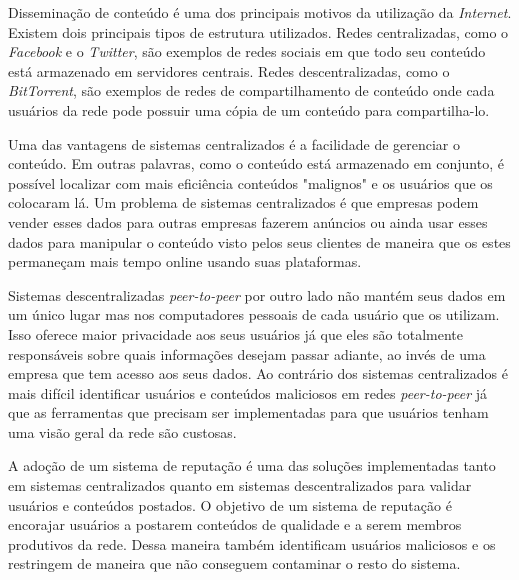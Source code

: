\documentclass[12pt]{article}
\newcommand{\PtoP} {\emph{peer-to-peer}\xspace}
\begin{document}
Disseminação de conteúdo é uma dos principais motivos da utilização da \emph{Internet}. Existem dois principais tipos de estrutura utilizados.
Redes centralizadas, como o \emph{Facebook} e o \emph{Twitter}, são exemplos de redes sociais em que todo seu conteúdo está armazenado em servidores centrais.
Redes descentralizadas, como o \emph{BitTorrent}, são exemplos de redes de compartilhamento de conteúdo onde cada usuários da rede pode possuir uma cópia de um conteúdo para compartilha-lo. 

Uma das vantagens de sistemas centralizados é a facilidade de gerenciar o conteúdo.
Em outras palavras, como o conteúdo está armazenado em conjunto, é possível localizar com mais eficiência conteúdos "malignos" e os usuários que os colocaram lá. %
Um problema de sistemas centralizados é que empresas podem vender esses dados para outras empresas fazerem anúncios ou ainda usar esses dados para manipular o conteúdo visto pelos seus clientes de maneira que os estes permaneçam mais tempo online usando suas plataformas. %

Sistemas descentralizadas \PtoP por outro lado não mantém seus dados em um único lugar mas nos computadores pessoais de cada usuário que os utilizam.
Isso oferece maior privacidade aos seus usuários já que eles são totalmente responsáveis sobre quais informações desejam passar adiante, ao invés de uma empresa que tem acesso aos seus dados. %
Ao contrário dos sistemas centralizados é mais difícil identificar usuários e conteúdos maliciosos em redes \PtoP já que as ferramentas que precisam ser implementadas para que usuários tenham uma visão geral da rede são custosas. 

A adoção de um sistema de reputação é uma das soluções implementadas tanto em sistemas centralizados quanto em sistemas descentralizados para validar usuários e conteúdos postados.
O objetivo de um sistema de reputação é encorajar usuários a postarem conteúdos de qualidade e a serem membros produtivos da rede. Dessa maneira também identificam usuários maliciosos e os restringem de maneira que não conseguem contaminar o resto do sistema.
\end{document}

